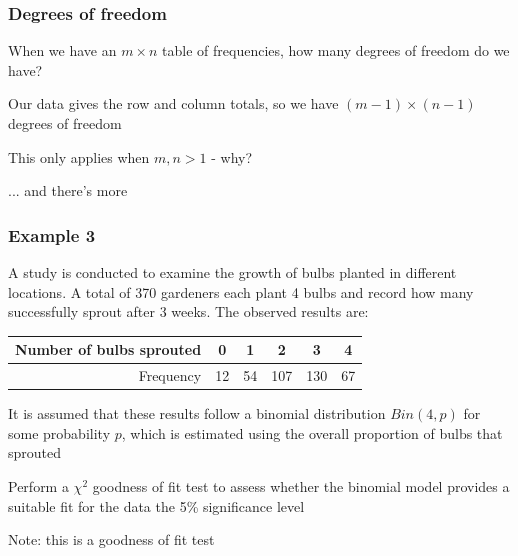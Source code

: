 \documentclass[t,8pt]{beamer}%
\begin{document}
\begin{frame}
	\frametitle{Degrees of freedom}
    When we have an $m\times n$ table of frequencies, how many degrees of freedom do we have?
\begin{center}
\end{center}
Our data gives the row and column totals, so we have $(m-1)\times(n-1)$ degrees of freedom \par
This only applies when $m,n>1$ - why? \par... and there's more
\end{frame}

\begin{frame}
	\frametitle{Example 3}
    A study is conducted to examine the growth of bulbs planted in different locations. A total of 370 gardeners each plant 4 bulbs and record how many successfully sprout after 3 weeks. The observed results are:
    \begin{center}
        \begin{tabular}{r|ccccc}
            Number of bulbs sprouted & 0 & 1 & 2 & 3 & 4 \\ \hline
            Frequency & 12 & 54 & 107 & 130 & 67 \\
        \end{tabular}
    \end{center}
It is assumed that these results follow a binomial distribution $Bin(4,p)$ for some probability 
$p$, which is estimated using the overall proportion of bulbs that sprouted \par
Perform a $\chi^2$ goodness of fit test to assess whether the binomial model provides a suitable fit for the data the 5\% significance level \par
Note: this is a goodness of fit test
\end{frame}
\end{document}
